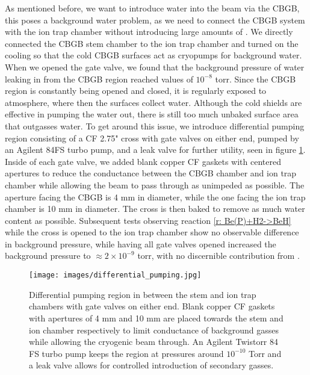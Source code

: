 As mentioned before, we want to introduce water into the beam via the CBGB, this poses a background water problem, as we need to connect the CBGB system with the ion trap chamber without introducing large amounts of . We directly connected the CBGB stem chamber to the ion trap chamber and turned on the cooling so that the cold CBGB surfaces act as cryopumps for background water. When we opened the gate valve, we found that the background pressure of water leaking in from the CBGB region reached values of $10^{-8}$ torr. Since the CBGB region is constantly being opened and closed, it is regularly exposed to atmosphere, where then the surfaces collect water. Although the cold shields are effective in pumping the water out, there is still too much unbaked surface area that outgasses water. To get around this issue, we introduce differential pumping region consisting of a CF 2.75" cross with gate valves on either end, pumped by an Agilent 84FS turbo pump, and a leak valve for further utility, seen in figure \ref{fig: differential pumping}. Inside of each gate valve, we added blank copper CF gaskets with centered apertures to reduce the conductance between the CBGB chamber and ion trap chamber while allowing the beam to pass through as unimpeded as possible. The aperture facing the CBGB is 4 mm in diameter, while the one facing the ion trap chamber is 10 mm in diameter. The cross is then baked to remove as much water content as possible. Subsequent tests observing reaction \ref{r: Be(P)+H2->BeH} while the cross is opened to the ion trap chamber show no observable difference in background pressure, while having all gate valves opened increased the background pressure to $\approx 2 \times 10^{-9}$ torr, with no discernible contribution from .

\begin{figure}[H]
	\centering
	\texttt{[image: images/differential\_pumping.jpg]}
	\caption{Differential pumping region in between the stem and ion trap chambers with gate valves on either end. Blank copper CF gaskets with apertures of 4 mm and 10 mm are placed towards the stem and ion chamber respectively to limit conductance of background gasses while allowing the cryogenic beam through. An Agilent Twistorr 84 FS turbo pump keeps the region at pressures around $10^{-10}$ Torr and a leak valve allows for controlled introduction of secondary gasses.}
	\label{fig: differential pumping}
\end{figure}